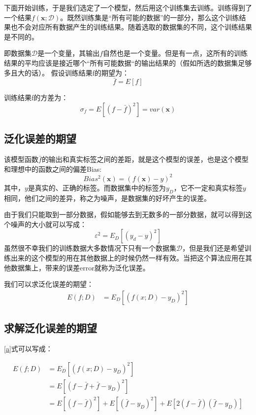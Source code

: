 \documentclass[12pt, letterpaper]{article}
\begin{document}
下面开始训练，于是我们选定了一个模型，然后用这个训练集去训练。训练得到了一个结果$f(\mathbf{x;\mathcal{D}})$。既然训练集是“所有可能的数据”的一部分，那么这个训练结果也不会对应所有数据产生的训练结果。随着选取的数据集的不同，这个训练结果是不同的。

即数据集$\mathcal{D}$是一个变量，其输出$f$自然也是一个变量。但是有一点，这所有的训练结果的平均应该是接近哪个“所有可能数据“的输出结果的（假如所选的数据集足够多且大的话）。
假设训练结果f的期望为：
$$
\bar{f} = E[f]
$$

训练结果f的方差为：
$$
\sigma_f = E[(f-\bar{f})^2] = var(\mathbf{x})
$$

\subsection{泛化误差的期望}

该模型函数$\bar{f}$的输出和真实标签之间的差距，就是这个模型的误差，也是这个模型和理想中的函数之间的偏差Bias:
$$
Bias^2(\mathbf{x}) = (f(\mathbf{x}) - y)^2
$$
其中，$y$是真实的、正确的标签。而数据集中的标签为$y_D$，它不一定和真实标签$y$相同，他们之间的差异，称之为噪声，是数据集的好坏产生的误差。

由于我们只能取到一部分数据，假如能够去到无数多的一部分数据，就可以得到这个噪声的大小就可以写成：
$$
\varepsilon^2=E_D[(y_d-y)^2]
$$
虽然很不幸我们的训练数据大多数情况下只有一个数据集$\mathcal{D}$，但是我们还是希望训练出来的这个模型的用在其他数据上的时候仍然一样有效。当把这个算法应用在其他数据集上，带来的误差error就称为泛化误差。

我们可以求泛化误差的期望：
\begin{equation}
\label{a}
\begin{aligned}
E(f;D)&=E_D[(f(x;D)-y_D)^2]
\end{aligned}
\end{equation}

\subsection{求解泛化误差的期望}
\ref{a}式可以写成：

$$
\begin{aligned}
E(f;D)&=E_D[(f(x;D)-y_D)^2]\\
&=E[(f-\bar{f}+\bar{f}-y_D)^2]\\
&=E[(f-\bar{f})^2] +E[(\bar{f}-y_D)^2] +E[2(f-\bar{f})(\bar{f}-y_D)]
\end{aligned}
$$
\end{document}
